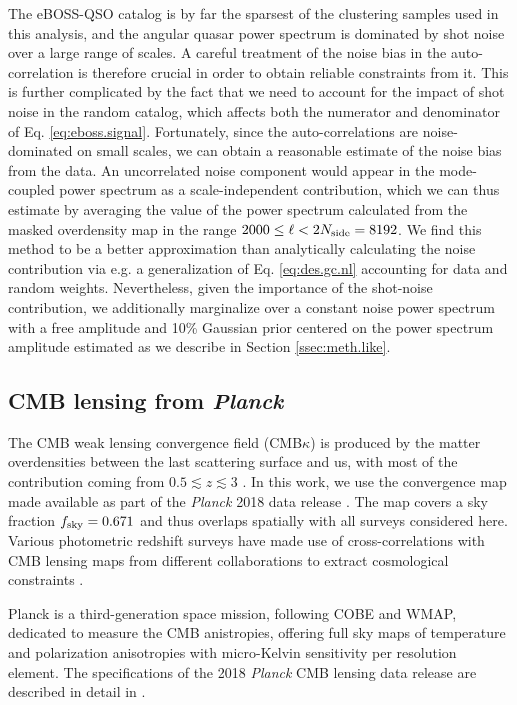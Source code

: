 \documentclass[a4paper,11pt]{article}
\newcommand{\fsky}{f_{\rm sky}}
\newcommand{\nside}{N_{\rm side}}
\newcommand{\cmbk}{CMB$\kappa$\xspace}
\newcommand{\planck}{{\sl Planck}\xspace}
\newcommand{\eboss}{eBOSS-QSO\xspace}
\begin{document}
      The \eboss catalog is by far the sparsest of the clustering samples used in this analysis, and the angular quasar power spectrum is dominated by shot noise over a large range of scales. A careful treatment of the noise bias in the auto-correlation is therefore crucial in order to obtain reliable constraints from it. This is further complicated by the fact that we need to account for the impact of shot noise in the random catalog, which affects both the numerator and denominator of Eq. \ref{eq:eboss.signal}. Fortunately, since the auto-correlations are noise-dominated on small scales, we can obtain a reasonable estimate of the noise bias from the data. An uncorrelated noise component would appear in the mode-coupled power spectrum as a scale-independent contribution, which we can thus estimate by averaging the value of the power spectrum calculated from the masked overdensity map in the range $2000 \leq \ell < 2 \nside = 8192$. We find this method to be a better approximation than analytically calculating the noise contribution via e.g. a generalization of Eq. \ref{eq:des.gc.nl} accounting for data and random weights. Nevertheless, given the importance of the shot-noise contribution, we additionally marginalize over a constant noise power spectrum with a free amplitude and 10\% Gaussian prior centered on the power spectrum amplitude estimated as we describe in Section \ref{ssec:meth.like}.

    \subsection{CMB lensing from \planck}\label{ssec:data.Planck}
      The CMB weak lensing convergence field (\cmbk) is produced by the matter overdensities between the last scattering surface and us, with most of the contribution coming from  $0.5 \lesssim z \lesssim 3$ \citep{astro-ph/9810257,astro-ph/0601594}. In this work, we use the convergence map made available as part of the \planck 2018 data release \cite{1807.06210}. The map covers a sky fraction $\fsky = 0.671$ and thus overlaps spatially with all surveys considered here. Various photometric redshift surveys have made use of cross-correlations with CMB lensing maps from different collaborations to extract cosmological constraints \cite{1810.02322,2008.04369,2010.00466,2011.11613,2102.07701,2103.15862,2105.03421}.

      Planck is a third-generation space mission, following COBE and WMAP, dedicated to measure the CMB anistropies, offering full sky maps of temperature and polarization anisotropies with micro-Kelvin sensitivity per resolution element. The specifications of the 2018 \planck CMB lensing data release are described in detail in \cite{1807.06210}.
\end{document}
